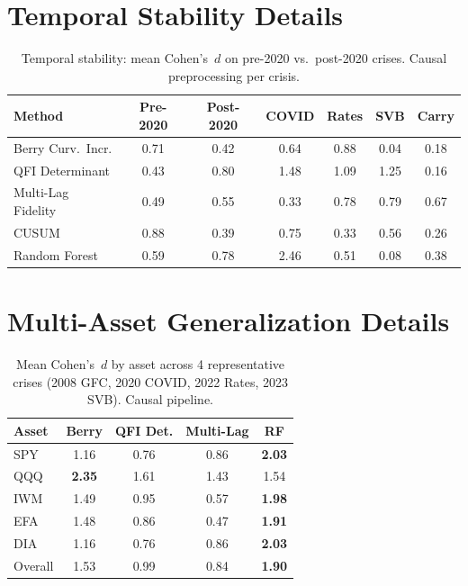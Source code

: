 \documentclass[3p]{elsarticle}
\begin{document}
\section{Temporal Stability Details}\label{sec:temporal_stability_appendix}

\begin{table}[htb]
\centering
\caption{Temporal stability: mean Cohen's~$d$ on pre-2020 vs.\
post-2020 crises.  Causal preprocessing per crisis.}
\label{tab:oos}
\small
\begin{tabular}{lcccccc}
\toprule
Method & Pre-2020 & Post-2020 & COVID & Rates & SVB & Carry \\
\midrule
Berry Curv.\ Incr. & 0.71 & 0.42 & 0.64 & 0.88 & 0.04 & 0.18 \\
QFI Determinant   & 0.43 & 0.80 & 1.48 & 1.09 & 1.25 & 0.16 \\
Multi-Lag Fidelity & 0.49 & 0.55 & 0.33 & 0.78 & 0.79 & 0.67 \\
CUSUM             & 0.88 & 0.39 & 0.75 & 0.33 & 0.56 & 0.26 \\
Random Forest     & 0.59 & 0.78 & 2.46 & 0.51 & 0.08 & 0.38 \\
\bottomrule
\end{tabular}
\end{table}

\section{Multi-Asset Generalization Details}\label{sec:multi_asset_appendix}

\begin{table}[htb]
\centering
\caption{Mean Cohen's~$d$ by asset across 4 representative crises
  (2008 GFC, 2020 COVID, 2022 Rates, 2023 SVB).  Causal pipeline.}
\label{tab:multi_asset}
\small
\begin{tabular}{lcccc}
\toprule
Asset & Berry & QFI Det. & Multi-Lag & RF \\
\midrule
SPY & 1.16 & 0.76 & 0.86 & \textbf{2.03} \\
QQQ & \textbf{2.35} & 1.61 & 1.43 & 1.54 \\
IWM & 1.49 & 0.95 & 0.57 & \textbf{1.98} \\
EFA & 1.48 & 0.86 & 0.47 & \textbf{1.91} \\
DIA & 1.16 & 0.76 & 0.86 & \textbf{2.03} \\
\midrule
Overall & 1.53 & 0.99 & 0.84 & \textbf{1.90} \\
\bottomrule
\end{tabular}
\end{table}
\end{document}
